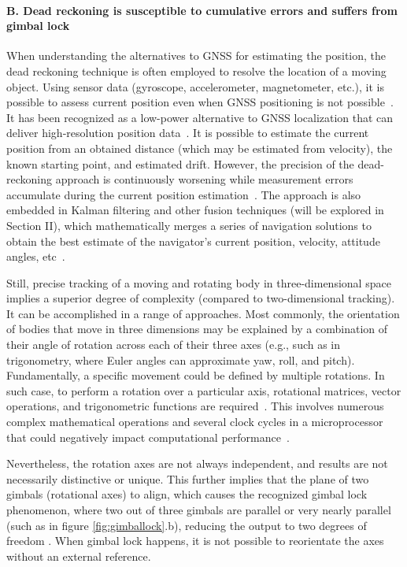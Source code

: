 \paragraph{B. Dead reckoning is susceptible to cumulative errors and suffers from gimbal lock} %
When understanding the alternatives to GNSS for estimating the position, the dead reckoning technique is often employed to resolve the location of a moving object. Using sensor data (gyroscope, accelerometer, magnetometer, etc.), it is possible to assess current position even when GNSS positioning is not possible~\cite{omar2016integration}. It has been recognized as a low-power alternative to GNSS localization that can deliver high‐resolution position data~\cite{dewhirst2016improving}. It is possible to estimate the current position from an obtained distance (which may be estimated from velocity), the known starting point, and estimated drift. However, the precision of the dead-reckoning approach is continuously worsening while measurement errors accumulate during the current position estimation~\cite{kao1991integration}. The approach is also embedded in Kalman filtering and other fusion techniques (will be explored in Section II), which mathematically merges a series of navigation solutions to obtain the best estimate of the navigator’s current position, velocity, attitude angles, etc~\cite{krakiwsky1988kalman}.

Still, precise tracking of a moving and rotating body in three-dimensional space implies a superior degree of complexity (compared to two-dimensional tracking). It can be accomplished in a range of approaches. Most commonly, the orientation of bodies that move in three dimensions may be explained by a combination of their angle of rotation across each of their three axes (e.g., such as in trigonometry, where Euler angles can approximate yaw, roll, and pitch). Fundamentally, a specific movement could be defined by multiple rotations. In such case, to perform a rotation over a particular axis, rotational matrices, vector operations, and trigonometric functions are required~\cite{bojanczyk1991computation}. This involves numerous complex mathematical operations and several clock cycles in a microprocessor that could negatively impact computational performance~\cite{janota2015improving}.

Nevertheless, the rotation axes are not always independent, and results are not necessarily distinctive or unique. This further implies that the plane of two gimbals (rotational axes) to align, which causes the recognized gimbal lock phenomenon, where two out of three gimbals are parallel or very nearly parallel (such as in figure \ref{fig:gimballock}.b), reducing the output to two degrees of freedom \cite{hemingway2018perspectives}. When gimbal lock happens, it is not possible to reorientate the axes without an external reference.

